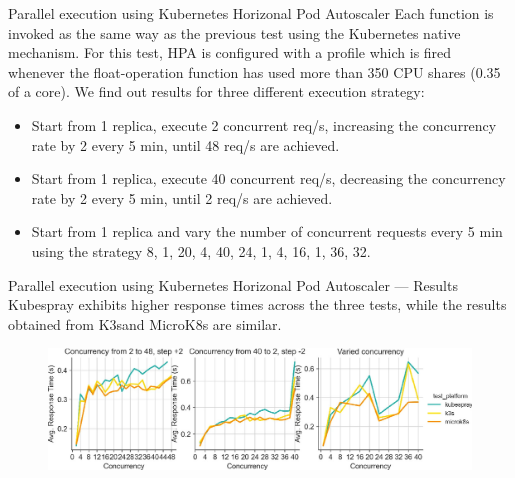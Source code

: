 \begin{frame}{Parallel execution using Kubernetes Horizonal Pod Autoscaler}
Each function is invoked as the same way as the previous test using the Kubernetes native mechanism. For this test, HPA is configured with a profile which is fired whenever the float-operation function has used more than 350 CPU shares (0.35 of a core). \pause
We find out results for three different execution strategy:

\begin{itemize}
    \item Start from 1 replica, execute 2 concurrent req/s, increasing the concurrency rate by 2 every 5 min, until 48 req/s are achieved.
    \item Start from 1 replica, execute 40 concurrent req/s, decreasing the concurrency rate by 2 every 5 min, until 2 req/s are achieved.
    \item Start from 1 replica and vary the number of concurrent requests every 5 min using the strategy 8, 1, 20, 4, 40, 24, 1, 4, 16, 1, 36, 32.
\end{itemize}
\end{frame}


\begin{frame}{Parallel execution using Kubernetes Horizonal Pod Autoscaler  — Results}
Kubespray exhibits higher response times across the three tests, while the results obtained from K3sand MicroK8s are similar.

\begin{figure}
    \centering
    \includegraphics[width=1\linewidth]{static/11227_2022_4430_Fig8_HTML.jpg}
\end{figure}
\end{frame}
